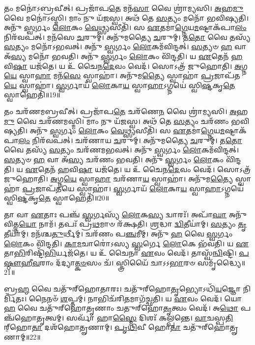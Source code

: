    𑌤𑌂 𑌮𑌨𑍋॑𑌽𑌬𑍍𑌰𑌵𑍀𑌤𑍍।
   𑌪𑍍𑌰𑌜𑌾᳴𑌪\-\ul{𑌤𑍇} 𑌮𑌨᳴\-\ul{𑌸𑌾} 𑌵𑍈 𑌶𑍍𑌰𑌾॑𑌮𑍍𑌯𑌸𑌿।
   \ul{𑌅}\-𑌹\-\ul{𑌮𑍁} 𑌵𑍈 𑌮𑌨𑍋॑𑌽𑌸𑍍𑌮𑌿।
   𑌮𑌾𑌂 𑌨𑍁 𑌯᳴𑌜𑌸𑍍𑌵।
   𑌅𑌥᳴ 𑌤𑍇 \ul{𑌸}\-𑌤𑍍𑌯𑌂 𑌮𑌨𑍋᳴ 𑌭𑌵𑌿𑌷𑍍𑌯𑌤𑌿।
   𑌅𑌨𑍁᳴ \ul{𑌸𑍍𑌵}\-𑌰𑍍𑌗𑌂 \ul{𑌲𑍋}\-𑌕𑌂 \ul{𑌵𑍇}\-𑌥𑍍𑌸𑍍𑌯𑌸𑍀𑌤𑌿᳴।
   𑌸 \ul{𑌏}\-𑌤𑌮𑌾॑\-\ul{𑌗𑍍𑌨𑍇}\-𑌯\-\ul{𑌮}\-𑌷𑍍𑌟𑌾𑌕᳴𑌪𑌾\-\ul{𑌲𑌂} 𑌨𑌿𑌰᳴𑌵𑌪𑌤𑍍।
   𑌮𑌨᳴𑌸𑍇 \ul{𑌚}\-𑌰𑍁𑌮𑍍।
   𑌅𑌨𑍁᳴𑌮𑌤𑍍𑌯𑍈 \ul{𑌚}\-𑌰𑍁𑌮𑍍।
   𑌤\-\ul{𑌤𑍋} 𑌵𑍈 𑌤𑌸𑍍𑌯᳴ \ul{𑌸}\-𑌤𑍍𑌯𑌂 𑌮𑌨𑍋᳴𑌽𑌭𑌵𑌤𑍍।
   𑌅𑌨𑍁᳴ \ul{𑌸𑍍𑌵}\-𑌰𑍍𑌗𑌂 \ul{𑌲𑍋}\-𑌕𑌮᳴𑌵𑌿𑌨𑍍𑌦𑌤𑍍।
   \ul{𑌸}\-𑌤𑍍𑌯𑍞 \ul{𑌹} 𑌵𑌾 𑌅᳴\-\ul{𑌸𑍍𑌯} 𑌮𑌨𑍋᳴ 𑌭𑌵𑌤𑌿।
   𑌅𑌨𑍁᳴ \ul{𑌸𑍍𑌵}\-𑌰𑍍𑌗𑌂 \ul{𑌲𑍋}\-𑌕𑌂 𑌵𑌿᳴𑌨𑍍𑌦𑌤𑌿।
   𑌯 \ul{𑌏}\-𑌤𑍇𑌨᳴ \ul{𑌹}\-𑌵𑌿\-\ul{𑌷𑌾} 𑌯𑌜᳴𑌤𑍇।
   𑌯 𑌉᳴ 𑌚𑍈𑌨\-\ul{𑌦𑍇}\-𑌵𑌂 𑌵𑍇𑌦᳴।
   𑌸𑍋𑌽𑌤𑍍𑌰᳴ 𑌜𑍁𑌹𑍋𑌤𑌿।
   \ul{𑌅}\-𑌗𑍍𑌨\-\ul{𑌯𑍇} 𑌸𑍍𑌵𑌾\-\ul{𑌹𑌾} 𑌮𑌨᳴\-\ul{𑌸𑍇} 𑌸𑍍𑌵𑌾𑌹𑌾॑।
   𑌅𑌨𑍁᳴𑌮\-\ul{𑌤𑍍𑌯𑍈} 𑌸𑍍𑌵𑌾𑌹𑌾॑ \ul{𑌪𑍍𑌰}\-𑌜𑌾𑌪᳴𑌤\-\ul{𑌯𑍇} 𑌸𑍍𑌵𑌾𑌹𑌾॑।
   \ul{𑌸𑍍𑌵}\-𑌰𑍍𑌗𑌾𑌯᳴ \ul{𑌲𑍋}\-𑌕𑌾\-\ul{𑌯} 𑌸𑍍𑌵𑌾\-\ul{𑌹𑌾}\-𑌽𑌗𑍍𑌨𑌯𑍇॑ 𑌸𑍍𑌵𑌿\-\ul{𑌷𑍍𑌟}\-𑌕𑍃\-\ul{𑌤𑍇} 𑌸𑍍𑌵𑌾𑌹𑍇𑌤𑌿᳴॥19॥

   𑌤𑌂 𑌚𑌰᳴𑌣𑌮𑌬𑍍𑌰𑌵𑍀𑌤𑍍।
   𑌪𑍍𑌰𑌜𑌾᳴𑌪\-\ul{𑌤𑍇} 𑌚𑌰᳴𑌣𑍇\-\ul{𑌨} 𑌵𑍈 𑌶𑍍𑌰𑌾॑𑌮𑍍𑌯𑌸𑌿।
   \ul{𑌅}\-𑌹\-\ul{𑌮𑍁} 𑌵𑍈 𑌚𑌰᳴𑌣𑌮𑌸𑍍𑌮𑌿।
   𑌮𑌾𑌂 𑌨𑍁 𑌯᳴𑌜𑌸𑍍𑌵।
   𑌅𑌥᳴ 𑌤𑍇 \ul{𑌸}\-𑌤𑍍𑌯𑌂 𑌚𑌰᳴𑌣𑌂 𑌭𑌵𑌿𑌷𑍍𑌯𑌤𑌿।
   𑌅𑌨𑍁᳴ \ul{𑌸𑍍𑌵}\-𑌰𑍍𑌗𑌂 \ul{𑌲𑍋}\-𑌕𑌂 \ul{𑌵𑍇}\-𑌥𑍍𑌸𑍍𑌯𑌸𑍀𑌤𑌿᳴।
   𑌸 \ul{𑌏}\-𑌤𑌮𑌾॑\-\ul{𑌗𑍍𑌨𑍇}\-𑌯\-\ul{𑌮}\-𑌷𑍍𑌟𑌾𑌕᳴𑌪𑌾\-\ul{𑌲𑌂} 𑌨𑌿𑌰᳴𑌵𑌪𑌤𑍍।
   𑌚𑌰᳴𑌣𑌾𑌯 \ul{𑌚}\-𑌰𑍁𑌮𑍍।
   𑌅𑌨𑍁᳴𑌮𑌤𑍍𑌯𑍈 \ul{𑌚}\-𑌰𑍁𑌮𑍍।
   𑌤\-\ul{𑌤𑍋} 𑌵𑍈 𑌤𑌸𑍍𑌯᳴ \ul{𑌸}\-𑌤𑍍𑌯𑌂 𑌚𑌰᳴𑌣𑌮𑌭𑌵𑌤𑍍।
   𑌅𑌨𑍁᳴ \ul{𑌸𑍍𑌵}\-𑌰𑍍𑌗𑌂 \ul{𑌲𑍋}\-𑌕𑌮᳴𑌵𑌿𑌨𑍍𑌦𑌤𑍍।
   \ul{𑌸}\-𑌤𑍍𑌯𑍞 \ul{𑌹} 𑌵𑌾 𑌅᳴\-\ul{𑌸𑍍𑌯} 𑌚𑌰᳴𑌣𑌂 𑌭𑌵𑌤𑌿।
   𑌅𑌨𑍁᳴ \ul{𑌸𑍍𑌵}\-𑌰𑍍𑌗𑌂 \ul{𑌲𑍋}\-𑌕𑌂 𑌵𑌿᳴𑌨𑍍𑌦𑌤𑌿।
   𑌯 \ul{𑌏}\-𑌤𑍇𑌨᳴ \ul{𑌹}\-𑌵𑌿\-\ul{𑌷𑌾} 𑌯𑌜᳴𑌤𑍇।
   𑌯 𑌉᳴ 𑌚𑍈𑌨\-\ul{𑌦𑍇}\-𑌵𑌂 𑌵𑍇𑌦᳴।
   𑌸𑍋𑌽𑌤𑍍𑌰᳴ 𑌜𑍁𑌹𑍋𑌤𑌿।
   \ul{𑌅}\-𑌗𑍍𑌨\-\ul{𑌯𑍇} 𑌸𑍍𑌵𑌾\-\ul{𑌹𑌾} 𑌚𑌰᳴𑌣𑌾\-\ul{𑌯} 𑌸𑍍𑌵𑌾𑌹𑌾॑।
   𑌅𑌨𑍁᳴𑌮\-\ul{𑌤𑍍𑌯𑍈} 𑌸𑍍𑌵𑌾𑌹𑌾॑ \ul{𑌪𑍍𑌰}\-𑌜𑌾𑌪᳴\-\ul{𑌤}\-𑌯𑍇 𑌸𑍍𑌵𑌾𑌹𑌾॑।
   \ul{𑌸𑍍𑌵}\-𑌰𑍍𑌗𑌾𑌯᳴ \ul{𑌲𑍋}\-𑌕𑌾\-\ul{𑌯} 𑌸𑍍𑌵𑌾\-\ul{𑌹𑌾}\-𑌽𑌗𑍍𑌨𑌯𑍇॑ 𑌸𑍍𑌵𑌿\-\ul{𑌷𑍍𑌟}\-𑌕𑍃\-\ul{𑌤𑍇} 𑌸𑍍𑌵𑌾𑌹𑍇𑌤𑌿᳴॥20॥

   𑌤𑌾 𑌵𑌾 \ul{𑌏}\-𑌤𑌾𑌃 𑌪𑌞𑍍𑌚᳴ \ul{𑌸𑍍𑌵}\-𑌰𑍍𑌗𑌸𑍍𑌯᳴ \ul{𑌲𑍋}\-𑌕\-\ul{𑌸𑍍𑌯} 𑌦𑍍𑌵𑌾𑌰𑌃᳴।
   𑌅𑌪𑌾᳴\-\ul{𑌘𑌾} 𑌅𑌨𑍁᳴𑌵𑌿𑌤𑍍𑌤\-\ul{𑌯𑍋} 𑌨𑌾𑌮᳴।
   𑌤𑌪𑌃᳴ 𑌪𑍍𑌰\-\ul{𑌥}\-𑌮𑌾𑍞 𑌰᳴𑌕𑍍𑌷𑌤𑌿।
   \ul{𑌶𑍍𑌰}\-𑌦𑍍𑌧𑌾 \ul{𑌦𑍍𑌵𑌿}\-𑌤𑍀𑌯𑌾॑𑌮𑍍।
   \ul{𑌸}\-𑌤𑍍𑌯𑌂 \ul{𑌤𑍃}\-𑌤𑍀𑌯𑌾॑𑌮𑍍।
   𑌮𑌨᳴𑌶𑍍𑌚\-\ul{𑌤𑍁}\-𑌰𑍍𑌥𑍀𑌮𑍍।
   𑌚𑌰᳴𑌣𑌂 𑌪\-\ul{𑌞𑍍𑌚}\-𑌮𑍀𑌮𑍍।
   𑌅𑌨𑍁᳴ \ul{𑌹} 𑌵𑍈 \ul{𑌸𑍍𑌵}\-𑌰𑍍𑌗𑌂 \ul{𑌲𑍋}\-𑌕𑌂 𑌵𑌿᳴𑌨𑍍𑌦𑌤𑌿।
   \ul{𑌕𑌾}\-\-\ul{𑌮}\-𑌚𑌾𑌰𑍋॑𑌽𑌸𑍍𑌯 \ul{𑌸𑍍𑌵}\-𑌰𑍍𑌗𑍇 \ul{𑌲𑍋}\-𑌕𑍇 𑌭᳴𑌵𑌤𑌿।
   𑌯 \ul{𑌏}\-𑌤𑌾\-\ul{𑌭𑌿}\-𑌰𑌿𑌷𑍍𑌟𑌿᳴\-\ul{𑌭𑌿}\-𑌰𑍍𑌯𑌜᳴𑌤𑍇।
   𑌯 𑌉᳴ 𑌚𑍈𑌨𑌾 \ul{𑌏}\-𑌵𑌂 𑌵𑍇𑌦᳴।
   𑌤𑌾𑌸𑍍𑌵᳴\-\ul{𑌨𑍍𑌵𑌿}\-𑌷𑍍𑌟𑌿।
   \ul{𑌪}\-\-\ul{𑌷𑍍𑌠𑍗}\-\-\ul{𑌹𑍀}\-\-\ul{𑌵}\-𑌰𑌾𑌂 𑌦᳴𑌦𑍍𑌯𑌾\-\ul{𑌤𑍍𑌕}\-\-\ul{𑍞}\-𑌸𑌂 𑌚᳴।
   𑌸𑍍𑌤𑍍𑌰𑌿𑌯𑍈᳴ 𑌚𑌾𑌽𑌽\-\ul{𑌭𑌾}\-𑌰𑍞 𑌸𑌮𑍃᳴𑌦𑍍𑌧𑍍𑌯𑍈॥21॥\anuvakamend
  
   𑌬𑍍𑌰\-\ul{𑌹𑍍𑌮}\- 𑌵𑍈 𑌚𑌤𑍁᳴𑌰𑍍‌𑌹𑍋𑌤𑌾𑌰𑌃।
   𑌚𑌤𑍁᳴𑌰𑍍‌𑌹𑍋\-\ul{𑌤𑍃}\-𑌭𑍍𑌯𑍋𑌽𑌧𑌿᳴\-\ul{𑌯}\-𑌜𑍍𑌞𑍋 𑌨𑌿𑌰𑍍𑌮𑌿᳴𑌤𑌃।
   𑌨𑍈𑌨𑍞᳴ \ul{𑌶}\-𑌪𑍍𑌤𑌮𑍍।
   𑌨𑌾𑌭𑌿𑌚᳴𑌰𑌿\-\ul{𑌤}\-𑌮𑌾𑌗᳴𑌚𑍍𑌛𑌤𑌿।
   𑌯 \ul{𑌏}\-𑌵𑌂 𑌵𑍇𑌦᳴।
   𑌯𑍋 \ul{𑌹} 𑌵𑍈 𑌚𑌤𑍁᳴𑌰𑍍‌𑌹𑍋𑌤𑍃𑌣𑌾𑌂 𑌚𑌤𑍁𑌰𑍍‌𑌹𑍋\-\ul{𑌤𑍃}\-𑌤𑍍𑌵𑌂 𑌵𑍇𑌦᳴।
   𑌅\-\ul{𑌥𑍋} 𑌪𑌞𑍍𑌚᳴𑌹𑍋𑌤𑍃𑌤𑍍𑌵𑌮𑍍।
   𑌸𑌰𑍍𑌵𑌾᳴ 𑌹𑌾\-\ul{𑌸𑍍𑌮𑍈} 𑌦𑌿𑌶𑌃᳴ 𑌕𑌲𑍍𑌪𑌨𑍍𑌤𑍇।
   \ul{𑌵𑌾}\-𑌚𑌸𑍍𑌪\-\ul{𑌤𑌿}\-𑌰𑍍‌॒𑌹𑍋\-\ul{𑌤𑌾} 𑌦𑌶᳴𑌹𑍋𑌤𑍄𑌣𑌾𑌮𑍍।
   \ul{𑌪𑍃}\-\-\ul{𑌥𑌿}\-𑌵𑍀 𑌹𑍋\-\ul{𑌤𑌾} 𑌚𑌤𑍁᳴𑌰𑍍‌𑌹𑍋𑌤𑍄𑌣𑌾𑌮𑍍॥22॥


